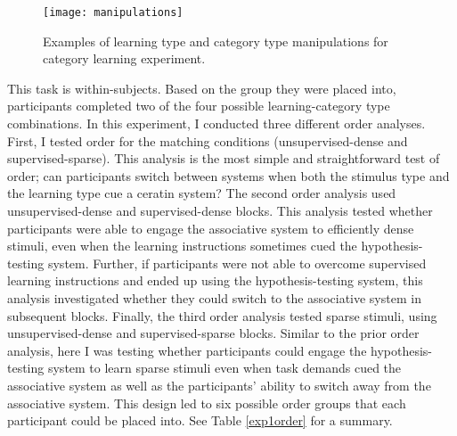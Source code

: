 \documentclass[../dissertation.tex]{subfiles}
\begin{document}
\begin{figure}[htp]
\texttt{[image: manipulations]}
\caption[Example stimuli for category learning task]{Examples of learning type and category type manipulations for category learning experiment.}
\vspace{-10pt}
\label{sloutskymanip}
\end{figure}
	This task is within-subjects. Based on the group they were placed into, participants completed two of the four possible learning-category type combinations. In this experiment, I conducted three different order analyses. First, I tested order for the matching conditions (unsupervised-dense and supervised-sparse). This analysis is the most simple and straightforward test of order; can participants switch between systems when both the stimulus type and the learning type cue a ceratin system? The second order analysis used unsupervised-dense and supervised-dense blocks. This analysis tested whether participants were able to engage the associative system to efficiently dense stimuli, even when the learning instructions sometimes cued the hypothesis-testing system. Further, if participants were not able to overcome supervised learning instructions and ended up using the hypothesis-testing system, this analysis investigated whether they could switch to the associative system in subsequent blocks. Finally, the third order analysis tested sparse stimuli, using unsupervised-dense and supervised-sparse blocks. Similar to the prior order analysis, here I was testing whether participants could engage the hypothesis-testing system to learn sparse stimuli even when task demands cued the associative system as well as the participants' ability to switch away from the associative system. This design led to six possible order groups that each participant could be placed into. See Table \ref{exp1order} for a summary. 
\end{document}
